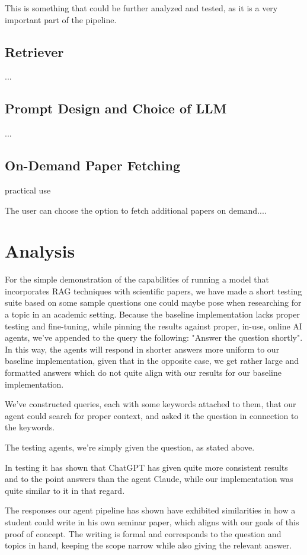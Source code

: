 \documentclass[fleqn,moreauthors,10pt]{ds_report}
\begin{document}
This is something that could be further analyzed and tested, as it is a very important part of the pipeline.

\subsection*{Retriever}
...

\subsection*{Prompt Design and Choice of LLM}
...
\subsection*{On-Demand Paper Fetching}
practical use

The user can choose the option to fetch additional papers on demand....


\section*{Analysis}
For the simple demonstration of the capabilities of running a model that incorporates RAG techniques with scientific papers, we have made a short testing suite based on some sample questions one could maybe pose when researching for a topic in an academic setting. Because the baseline implementation lacks proper testing and fine-tuning, while pinning the results against proper, in-use, online AI agents, we've appended to the query the following: "Answer the question shortly". In this way, the agents will respond in shorter answers more uniform to our baseline implementation, given that in the opposite case, we get rather large and formatted answers which do not quite align with our results for our baseline implementation.

We've constructed queries, each with some keywords attached to them, that our agent could search for proper context, and asked it the question in connection to the keywords.

The testing agents, we're simply given the question, as stated above.

In testing it has shown that ChatGPT has given quite more consistent results and to the point answers than the agent Claude, while our implementation was quite similar to it in that regard.

The responses our agent pipeline has shown have exhibited similarities in how a student could write in his own seminar paper, which aligns with our goals of this proof of concept.
The writing is formal and corresponds to the question and topics in hand, keeping the scope narrow while also giving the relevant answer.
\end{document}
